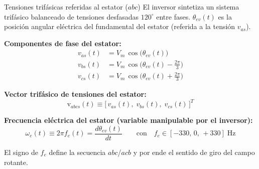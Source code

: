 \documentclass[aspectratio=169,t]{beamer}
\begin{document}
\begin{frame}{Tensiones trifásicas referidas al estator ($abc$)}
{\small\color{uncGray}El inversor sintetiza un sistema trifásico balanceado de tensiones desfasadas $120^\circ$ entre fases. $\theta_{ev}(t)$ es la posición angular eléctrica del fundamental del estator (referida a la tensión $v_{as}$).}\par
\vspace{4mm}

\textbf{Componentes de fase del estator:}
\begin{align*}
v_{as}(t) &= V_m\,\cos\!\big(\theta_{ev}(t)\big) \\
v_{bs}(t) &= V_m\,\cos\!\big(\theta_{ev}(t) - \tfrac{2\pi}{3}\big) \\
v_{cs}(t) &= V_m\,\cos\!\big(\theta_{ev}(t) + \tfrac{2\pi}{3}\big)
\end{align*}

\textbf{Vector trifásico de tensiones del estator:}
\begin{equation*}
\bm{\mathrm{v}}_{abcs}(t) \equiv \big[\,v_{as}(t),\;v_{bs}(t),\;v_{cs}(t)\,\big]^T
\end{equation*}

\textbf{Frecuencia eléctrica del estator (variable manipulable por el inversor):}
\begin{equation*}
\omega_e(t) \equiv 2\pi f_e(t) = \frac{d\theta_{ev}(t)}{dt}
\qquad\text{con}\quad f_e\in[-330,\,0,\,+330]\;\text{Hz}
\end{equation*}

{\small El signo de $f_e$ define la secuencia $abc$/$acb$ y por ende el sentido de giro del campo rotante.}
\end{frame}
\end{document}
